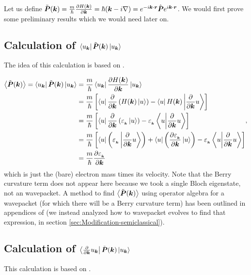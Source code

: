 \documentclass{report}
\renewcommand\vec[1]{\ensuremath\boldsymbol{#1}} %
\begin{document}
Let us define $\tilde{\vec{P}}(\vec{k})= \frac{m}{\hbar} \frac{\partial H(\vec{k})}{\partial \vec{k}} = \hbar(\vec{k} - i\nabla) = e^{-i \vec{k}\cdot\vec{r}} \hat{\vec{P}} e^{i \vec{k}\cdot\vec{r}}$. We would first prove some preliminary results which we would need later on.

\subsection{Calculation of $\bra{u_{\vec{k}}} \tilde{\vec{P}}(\vec{k}) \ket{u_{\vec{k}}}$}
The idea of this calculation is based on \cite{chang1996}.

$$
\begin{aligned}
	\expval{\tilde{\vec{P}}(\vec{k})} = \bra{u_{\vec{k}}} \tilde{\vec{P}}(\vec{k}) \ket{u_{\vec{k}}} &= \frac{m}{\hbar} \bra{u_{\vec{k}}} \frac{\partial H(\vec{k})}{\partial \vec{k}} \ket{u_{\vec{k}}} \\
	&= \frac{m}{\hbar} \left[\bra{u} \frac{\partial}{\partial \vec{k}} \left(H(\vec{k}) \ket{u}\right) - \bra{u}H(\vec{k})\ket{\frac{\partial}{\partial \vec{k}} u}\right] \\
	&= \frac{m}{\hbar} \left[\bra{u} \frac{\partial}{\partial \vec{k}} \left(\varepsilon_{_{\vec{k}}} \ket{u}\right) - \varepsilon_{_{\vec{k}}} \bra{u}\ket{\frac{\partial}{\partial \vec{k}} u}\right]\\
	&= \frac{m}{\hbar} \left[\bra{u}  \left(\varepsilon_{_{\vec{k}}} \ket{\frac{\partial}{\partial \vec{k}}u}\right)  +  \bra{u}  \left(\frac{\partial \varepsilon_{_{\vec{k}}}}{\partial \vec{k}} \ket{u}\right) - \varepsilon_{_{\vec{k}}} \bra{u}\ket{\frac{\partial}{\partial \vec{k}} u}\right]\\
	&= \frac{m}{\hbar} \frac{\partial \varepsilon_{_{\vec{k}}}}{\partial \vec{k}}
\end{aligned},
$$
which is just the (bare) electron mass times its velocity. Note that the Berry curvature term does not appear here because we took a single Bloch eigenstate, not an wavepacket. A method to find $\expval{\tilde{\vec{P}}(\vec{k})}$ using operator algebra for a wavepacket (for which there will be a Berry curvature term) has been outlined in appendices of \cite{ralph2020berry} (we instead analyzed how to wavepacket evolves to find that expression, in section \ref{sec:Modification-semiclassical}).

\subsection{Calculation of $\bra{\frac{\partial}{\partial \vec{k}} u_{\vec{k}}} \tilde{\vec{P}}(\vec{k}) \ket{u_{\vec{k}}}$}
This calculation is based on \cite{chang1996}.
\end{document}
